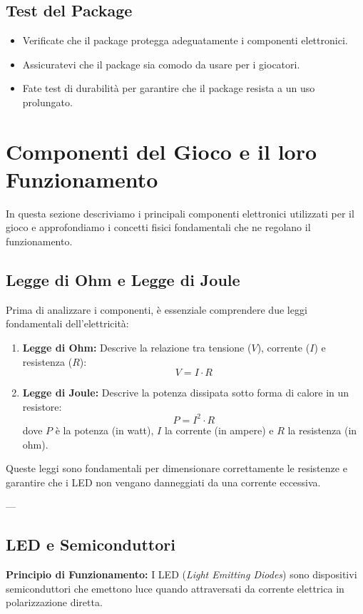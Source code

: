 \documentclass[a4paper,12pt]{report}
\begin{document}
\subsection{Test del Package}
\begin{itemize}
    \item Verificate che il package protegga adeguatamente i componenti elettronici.
    \item Assicuratevi che il package sia comodo da usare per i giocatori.
    \item Fate test di durabilit\`a per garantire che il package resista a un uso prolungato.
\end{itemize}

\section{Componenti del Gioco e il loro Funzionamento}

In questa sezione descriviamo i principali componenti elettronici utilizzati per il gioco e approfondiamo i concetti fisici fondamentali che ne regolano il funzionamento.

\subsection{Legge di Ohm e Legge di Joule}
Prima di analizzare i componenti, è essenziale comprendere due leggi fondamentali dell'elettricità:
\begin{enumerate}
    \item \textbf{Legge di Ohm:} Descrive la relazione tra tensione (\(V\)), corrente (\(I\)) e resistenza (\(R\)):
    \[
    V = I \cdot R
    \]
    \item \textbf{Legge di Joule:} Descrive la potenza dissipata sotto forma di calore in un resistore:
    \[
    P = I^2 \cdot R
    \]
    dove \(P\) è la potenza (in watt), \(I\) la corrente (in ampere) e \(R\) la resistenza (in ohm).
\end{enumerate}

Queste leggi sono fondamentali per dimensionare correttamente le resistenze e garantire che i LED non vengano danneggiati da una corrente eccessiva.

---

\subsection{LED e Semiconduttori}
\textbf{Principio di Funzionamento:} I LED (\textit{Light Emitting Diodes}) sono dispositivi semiconduttori che emettono luce quando attraversati da corrente elettrica in polarizzazione diretta.
\end{document}
